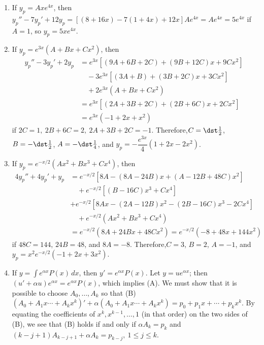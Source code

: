 \documentclass[openany]{book}
\newenvironment{sectionSolutions}{
 \begin{enumerate}[item-label={\thesection.\arabic{enumi}.}]
}{
 \end{enumerate}
}
\begin{document}
\begin{sectionSolutions}
\item
If $y_p=Axe^{4x}$, then
$y_p''-7y_p'+12y_p=[(8+16x)-7(1+4x)+12x]Ae^{4x}=Ae^{4x}=5e^{4x}$
if $A=1$, so $y_p=5xe^{4x}$.


\item
If $y_p=e^{3x}(A+Bx+Cx^2)$, then
\begin{align*}
y_p''-3y_p'+2y_p&=e^{3x}[(9A+6B+2C)+(9B+12C)x+9Cx^2]\\
&\quad-3e^{3x}[(3A+B)+(3B+2C)x+3Cx^2]\\
&\quad+2e^{3x}(A+Bx+Cx^2)\\
&=e^{3x}[(2A+3B+2C)+(2B+6C)x+2Cx^2]\\
&=e^{3x}(-1+2x+x^2)
\end{align*}
if $2C=1,\ 2B+6C=2,\ 2A+3B+2C= -1$. Therefore,$C=\dst\frac{1}{2}$,
$B=-\dst\frac{1}{2}$, $A=-\dst\frac{1}{4}$, and
$y_p=-\dfrac{e^{3x}}{4}(1+2x-2x^2)$.


\item
If $y_p=e^{-x/2}(Ax^2+Bx^3+Cx^4)$, then
\begin{align*}
4y_p''+4y_p'+y_p&=e^{-x/2}[8A-(8A-24B)x+(A-12B+48C)x^2]\\
&\quad+e^{-x/2}[(B-16C)x^3+Cx^4]\\
&+e^{-x/2}[8Ax-(2A-12B)x^2-(2B-16C)x^3-2Cx^4]\\
&\quad+e^{-x/2}(Ax^2+Bx^3+Cx^4)\\
&=e^{-x/2}(8A+24Bx+48Cx^2)=e^{-x/2}(-8+48x+144x^2)
\end{align*}
if $48C=144$, $24B=48$, and $8A=-8$. Therefore,$C=3$, $B=2$, $A=-1$,
and $y_p=x^2e^{-x/2}(-1+2x+3x^2)$.


\item If $y=\int e^{\alpha x}P(x)\,dx$, then
$y'=e^{\alpha x}P(x)$. Let $y=ue^{\alpha x}$; then $(u'+\alpha
u)e^{\alpha x}=e^{\alpha x}P(x)$, which implies (A). We must show that
it is possible to choose $A_0,\dots,A_k$ so that (B)
$(A_0+A_1x\cdots+A_kx^k)'+\alpha(A_0+A_1x\cdots+A_kx^k)=
p_0+p_1x+\cdots+p_kx^k$. By equating the coefficients of $x^k,
x^{k-1},\dots,1$ (in that order) on the two sides of (B), we see that
(B) holds if and only if $\alpha A_k=p_k$ and $(k-j+1)A_{k-j+1}+\alpha
A_k=p_{k-j},\ 1\le j\le k$.



\end{sectionSolutions}
\end{document}
